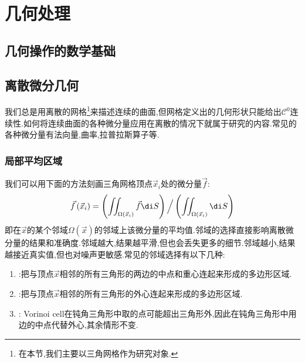 \documentclass{ctexart}
\begin{document}
\section{几何处理}
\subsection{几何操作的数学基础}
\subsection{离散微分几何}
我们总是用离散的网格\footnote{在本节,我们主要以三角网格作为研究对象.}来描述连续的曲面,但网格定义出的几何形状只能给出$\mathcal{C}^0$连续性.如何将连续曲面的各种微分量应用在离散的情况下就属于研究的内容.常见的各种微分量有法向量,曲率,拉普拉斯算子等.
\subsubsection{局部平均区域}
我们可以用下面的方法刻画三角网格顶点$\vec{x}_i$处的微分量$\vec{f}$:
\[\vec{f}\left(\vec{x}_i\right)=\left(\displaystyle\iint_{\Omega\left(\vec{x}_i\right)}\vec{f}\di S\right)\Big/\left(\displaystyle\iint_{\Omega\left(\vec{x}_i\right)}\di S\right)\]
即在$\vec{x}$的某个邻域$\Omega(\vec{x})$的邻域上该微分量的平均值.邻域的选择直接影响离散微分量的结果和准确度.邻域越大,结果越平滑,但也会丢失更多的细节.邻域越小,结果越接近真实值,但也对噪声更敏感.常见的邻域选择有以下几种:
\begin{enumerate}[label=\tbf{\arabic*.},topsep=0pt,parsep=0pt,itemsep=0pt,partopsep=0pt]
    \item {}:把与顶点$\vec{x}$相邻的所有三角形的两边的中点和重心连起来形成的多边形区域.
    \item {}:把与顶点$\vec{x}$相邻的所有三角形的外心连起来形成的多边形区域.
    \item {}: Vorinoi cell在钝角三角形中取的点可能超出三角形外,因此在钝角三角形中用边的中点代替外心,其余情形不变.
\end{enumerate}
\end{document}
